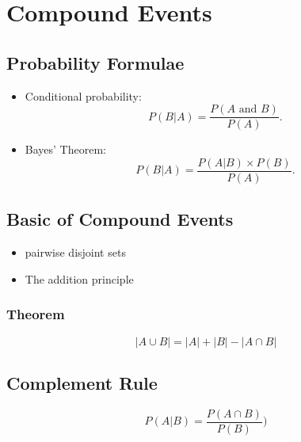 \documentclass[12pt]{report}
\begin{document}
{%
{\LARGE

\chapter{Compound Events}
\section{Probability Formulae}

\begin{itemize}
	
	\item Conditional probability:
	\begin{equation*}
	P(B|A)=\frac{P\left( A\text{ and }B\right) }{P\left( A\right) }.
	\end{equation*}
	
	
	\item Bayes' Theorem:
	\begin{equation*}
	P(B|A)=\frac{P\left(A|B\right) \times P(B) }{P\left( A\right) }.
	\end{equation*}
\end{itemize}


\section{Basic of Compound Events}

\begin{itemize}
	\item pairwise disjoint sets
	\item The addition principle
\end{itemize}
\subsection*{Theorem}
\[ |A \cup B| = |A| + |B| - |A \cap B|  \]
\section*{Complement Rule}



\[P(A |B) = \frac{P(A \cap B)}{P(B)})\]

}}
\end{document}
